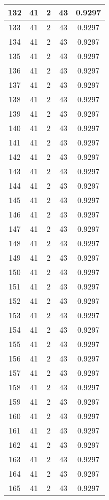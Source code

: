 \documentclass[letterpaper, 12pt]{article}
\begin{document}
\begin{longtable}{|c|c|c|c|c|}
\hline
132 & 41 & 2 & 43 & 0.9297 \\
\hline
133 & 41 & 2 & 43 & 0.9297 \\
\hline
134 & 41 & 2 & 43 & 0.9297 \\
\hline
135 & 41 & 2 & 43 & 0.9297 \\
\hline
136 & 41 & 2 & 43 & 0.9297 \\
\hline
137 & 41 & 2 & 43 & 0.9297 \\
\hline
138 & 41 & 2 & 43 & 0.9297 \\
\hline
139 & 41 & 2 & 43 & 0.9297 \\
\hline
140 & 41 & 2 & 43 & 0.9297 \\
\hline
141 & 41 & 2 & 43 & 0.9297 \\
\hline
142 & 41 & 2 & 43 & 0.9297 \\
\hline
143 & 41 & 2 & 43 & 0.9297 \\
\hline
144 & 41 & 2 & 43 & 0.9297 \\
\hline
145 & 41 & 2 & 43 & 0.9297 \\
\hline
146 & 41 & 2 & 43 & 0.9297 \\
\hline
147 & 41 & 2 & 43 & 0.9297 \\
\hline
148 & 41 & 2 & 43 & 0.9297 \\
\hline
149 & 41 & 2 & 43 & 0.9297 \\
\hline
150 & 41 & 2 & 43 & 0.9297 \\
\hline
151 & 41 & 2 & 43 & 0.9297 \\
\hline
152 & 41 & 2 & 43 & 0.9297 \\
\hline
153 & 41 & 2 & 43 & 0.9297 \\
\hline
154 & 41 & 2 & 43 & 0.9297 \\
\hline
155 & 41 & 2 & 43 & 0.9297 \\
\hline
156 & 41 & 2 & 43 & 0.9297 \\
\hline
157 & 41 & 2 & 43 & 0.9297 \\
\hline
158 & 41 & 2 & 43 & 0.9297 \\
\hline
159 & 41 & 2 & 43 & 0.9297 \\
\hline
160 & 41 & 2 & 43 & 0.9297 \\
\hline
161 & 41 & 2 & 43 & 0.9297 \\
\hline
162 & 41 & 2 & 43 & 0.9297 \\
\hline
163 & 41 & 2 & 43 & 0.9297 \\
\hline
164 & 41 & 2 & 43 & 0.9297 \\
\hline
165 & 41 & 2 & 43 & 0.9297 \\

\end{longtable}
\end{document}

